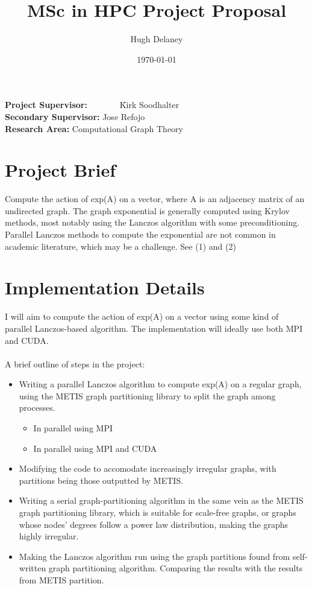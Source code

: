 \documentclass[a4paper, fleqn]{article}
\date{\today}
\author{Hugh Delaney}
\title{MSc in HPC Project Proposal}
\begin{document}
\maketitle
\begin{tabbing}
        \textbf{Project Supervisor:}~~~~~~~ \=Kirk Soodhalter \\
        \textbf{Secondary Supervisor:} \>Jose Refojo \\
        \textbf{Research Area:}  \> Computational Graph Theory \\
\end{tabbing}

\section*{Project Brief}%
\label{sec:project_brief}
Compute the action of exp(A) on a vector, where A is an  adjacency matrix of an undirected graph. The graph exponential is generally computed using Krylov methods, most notably using the Lanczos algorithm with some preconditioning. Parallel Lanczos methods to compute the exponential are not common in academic literature, which may be a challenge. See (1) and (2) 

\section*{Implementation Details}%
\label{sec:project_brief}

I will aim to compute the action of exp(A) on a vector using some kind of parallel Lanczos-based algorithm. The implementation will ideally use both MPI and CUDA.
\\ \\ A brief outline of steps in the project:

\begin{itemize}
        \item Writing a parallel Lanczos algorithm to compute exp(A) on a regular graph, using the METIS graph partitioning library to split the graph among processes.
                \begin{itemize}
                        \item In parallel using MPI
                        \item In parallel using MPI and CUDA
                \end{itemize}
        \item Modifying the code to accomodate increasingly irregular graphs, with partitions being those outputted by METIS.
        \item Writing a serial graph-partitioning algorithm in the same vein as the METIS graph partitioning library, which is suitable for scale-free graphs, or graphs whose nodes' degrees follow a power law distribution, making the graphs highly irregular.
        \item Making the Lanczos algorithm run using the graph partitions found from self-written graph partitioning algorithm. Comparing the results with the results from METIS partition.
\end{itemize}
\end{document}
